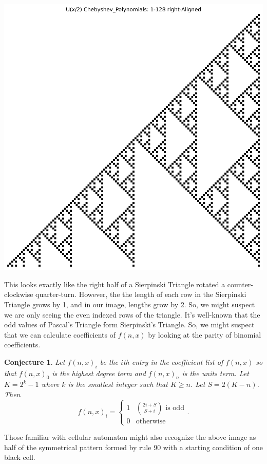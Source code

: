 \documentclass{article}
\newtheorem{conjecture}{Conjecture}
\begin{document}
	\begin{center}
		\includegraphics[width=.8\textwidth]{../../code/serialization/chebyshev/chebyshev1_right_128.png}	
	\end{center}

	This looks exactly like the right half of a Sierpinski Triangle rotated a counter-clockwise quarter-turn.
	However, the the length of each row in the Sierpinski Triangle grows by 1, and in our image, lengths grow by 2.
	So, we might suspect we are only seeing the even indexed rows of the triangle.
	It's well-known that the odd values of Pascal's Triangle form Sierpinski's Triangle.
	So, we might suspect that we can calculate coefficients of $f(n,x)$ by looking at the parity of binomial coefficients.
	
	\begin{conjecture}
		Let $f(n,x)_i$ be the $i$th entry in the coefficient list of $f(n,x)$ so that $f(n,x)_0$ is the highest degree term and $f(n,x)_n$ is the units term.
		Let $K = 2^k - 1$ where $k$ is the smallest integer such that $K \geq n$.
		Let $S = 2(K-n)$.
		Then
		\begin{equation*}
			f(n,x)_i = \begin{cases}
				1 & \binom{2i + S}{S + i} \text{ is odd} \\
				0 & \text{otherwise}
			\end{cases}.
		\end{equation*}
	\end{conjecture}

	Those familiar with cellular automaton might also recognize the above image as half of the symmetrical pattern formed by rule 90 with a starting condition of one black cell.
\end{document}
